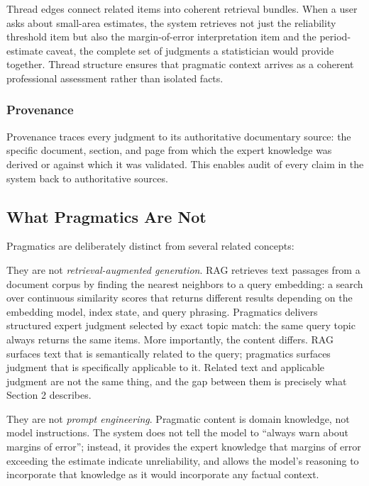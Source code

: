 \documentclass[
  11pt,
  letterpaper,
]{article}
\begin{document}
Thread edges connect related items into coherent retrieval bundles. When
a user asks about small-area estimates, the system retrieves not just
the reliability threshold item but also the margin-of-error
interpretation item and the period-estimate caveat, the complete set of
judgments a statistician would provide together. Thread structure
ensures that pragmatic context arrives as a coherent professional
assessment rather than isolated facts.

\subsubsection{Provenance}\label{provenance}

Provenance traces every judgment to its authoritative documentary
source: the specific document, section, and page from which the expert
knowledge was derived or against which it was validated. This enables
audit of every claim in the system back to authoritative sources.

\subsection{What Pragmatics Are Not}\label{what-pragmatics-are-not}

Pragmatics are deliberately distinct from several related concepts:

They are not \emph{retrieval-augmented generation}. RAG retrieves text
passages from a document corpus by finding the nearest neighbors to a
query embedding: a search over continuous similarity scores that returns
different results depending on the embedding model, index state, and
query phrasing. Pragmatics delivers structured expert judgment selected
by exact topic match: the same query topic always returns the same
items. More importantly, the content differs. RAG surfaces text that is
semantically related to the query; pragmatics surfaces judgment that is
specifically applicable to it. Related text and applicable judgment are
not the same thing, and the gap between them is precisely what Section 2
describes.

They are not \emph{prompt engineering}. Pragmatic content is domain
knowledge, not model instructions. The system does not tell the model to
``always warn about margins of error''; instead, it provides the expert
knowledge that margins of error exceeding the estimate indicate
unreliability, and allows the model's reasoning to incorporate that
knowledge as it would incorporate any factual context.
\end{document}
